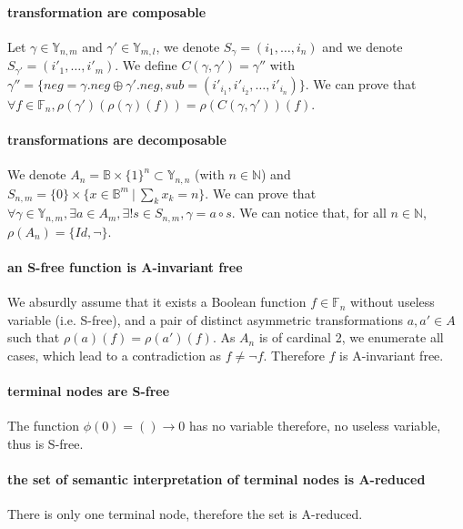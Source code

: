 \documentclass[a4paper,10pt]{article}
\newcommand{\N}{\mathbb{N}}%
\newcommand{\B}{\mathbb{B}}
\newcommand{\F}{\mathbb{F}}
\newcommand{\Y}{\mathbb{Y}}
\begin{document}
\paragraph{transformation are composable\\}
Let $\gamma\in\Y_{n, m}$ and $\gamma'\in\Y_{m, l}$, we denote $S_{\gamma} = (i_1, \dots, i_n)$ and we denote $S_{\gamma'} = (i'_1, \dots, i'_m)$.
We define $C(\gamma, \gamma') = \gamma''$ with $\gamma'' = \{neg = \gamma.neg \oplus \gamma'.neg, sub = (i'_{i_1}, i'_{i_2}, \dots, i'_{i_n})\}$.
We can prove that $\forall f\in\F_n, \rho(\gamma')(\rho(\gamma)(f)) = \rho(C(\gamma, \gamma'))(f)$.

\paragraph{transformations are decomposable\\}
We denote $A_n = \B\times\{1\}^n \subset\Y_{n, n}$ (with $n\in\N$) and $S_{n, m} = \{0\}\times\{x\in\B^m~|~\sum_k x_k = n\}$.
We can prove that $\forall \gamma \in \Y_{n, m}, \exists a \in A_m, \exists! s \in S_{n, m},  \gamma = a \circ s$.
We can notice that, for all $n\in\N$, $\rho(A_n) = \{Id, \lnot\}$.

\paragraph{an S-free function is A-invariant free\\}
We absurdly assume that it exists a Boolean function $f\in\F_n$ without useless variable (i.e. S-free), and a pair of distinct asymmetric transformations $a, a'\in A$ such that $\rho(a)(f) = \rho(a')(f)$.
As $A_n$ is of cardinal 2, we enumerate all cases, which lead to a contradiction as $f \neq \lnot f$.
Therefore $f$ is A-invariant free.

\paragraph{terminal nodes are S-free\\}
The function $\phi(0) = () \longrightarrow 0$ has no variable therefore, no useless variable, thus is S-free.

\paragraph{the set of semantic interpretation of terminal nodes is A-reduced\\}
There is only one terminal node, therefore the set is A-reduced.
\end{document}
